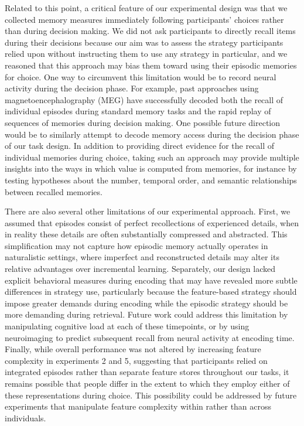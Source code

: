 \documentclass[10pt,letterpaper]{article}
\begin{document}
Related to this point, a critical feature of our experimental design was that we collected memory measures immediately following participants' choices rather than during decision making. We did not ask participants to directly recall items during their decisions because our aim was to assess the strategy participants relied upon without instructing them to use any strategy in particular, and we reasoned that this approach may bias them toward using their episodic memories for choice. One way to circumvent this limitation would be to record neural activity during the decision phase. For example, past approaches using magnetoencephalography (MEG) have successfully decoded both the recall of individual episodes during standard memory tasks\cite{michelmannSpeedTimecompressedForward2019, wimmerEpisodicMemoryRetrieval2020} and the rapid replay of sequences of memories during decision making\cite{liuExperienceReplayAssociated2021, mcfadyenDifferentialReplayReward2023, wimmerDistinctReplaySignatures2023}. One possible future direction would be to similarly attempt to decode memory access during the decision phase of our task design. In addition to providing direct evidence for the recall of individual memories during choice, taking such an approach may provide multiple insights into the ways in which value is computed from memories, for instance by testing hypotheses about the number, temporal order, and semantic relationships between recalled memories.

There are also several other limitations of our experimental approach. First, we assumed that episodes consist of perfect recollections of experienced details, when in reality these details are often substantially compressed and abstracted\cite{carmichaelExperimentalStudyEffect1932, nagySemanticCompressionEpisodic2018, zhouPatternSeparationUsing, kerrenExploringRoleDimensionality2025}. This simplification may not capture how episodic memory actually operates in naturalistic settings, where imperfect and reconstructed details may alter its relative advantages over incremental learning. Separately, our design lacked explicit behavioral measures during encoding that may have revealed more subtle differences in strategy use, particularly because the feature-based strategy should impose greater demands during encoding while the episodic strategy should be more demanding during retrieval. Future work could address this limitation by manipulating cognitive load at each of these timepoints, or by using neuroimaging to predict subsequent recall from neural activity at encoding time. Finally, while overall performance was not altered by increasing feature complexity in experiments 2 and 5, suggesting that participants relied on integrated episodes rather than separate feature stores throughout our tasks, it remains possible that people differ in the extent to which they employ either of these representations during choice. This possibility could be addressed by future experiments that manipulate feature complexity within rather than across individuals.
\end{document}
